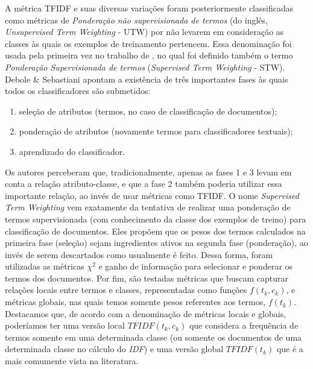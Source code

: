A métrica \textsc{TFIDF} e suas diversas variações foram posteriormente classificadas como métricas de \textit{Ponderação não supervisionada de termos} (do inglês, \textit{Unsupervised Term Weighting} - \textsc{UTW}) por não levarem em consideração as classes às quais os exemplos de treinamento pertencem. Essa denominação foi usada pela primeira vez no trabalho de \cite{Debole03}, no qual foi definido também o termo \textit{Ponderação Supervisionada de termos} (\textit{Supervised Term Weighting} - \textsc{STW}). 
Debole \& Sebastiani apontam a existência de três importantes fases às quais todos os classificadores são submetidos: 
\begin{enumerate}
\item seleção de atributos (termos, no caso de classificação de documentos);
\item ponderação de atributos (novamente termos para classificadores textuais);
\item aprendizado do classificador.
\end{enumerate}
Os autores perceberam que, tradicionalmente, apenas as fases 1 e 3 levam em conta a relação atributo-classe, e que a fase 2 também poderia utilizar essa importante relação, ao invés de usar métricas como \textsc{TFIDF}.
O nome \textit{Supervised Term Weighting} vem exatamente da tentativa de realizar uma ponderação de termos supervisionada (com conhecimento da classe dos exemplos de treino) para classificação de documentos. Eles propõem que os pesos dos termos calculados na primeira fase (seleção) sejam ingredientes ativos na segunda fase (ponderação), ao invés de serem descartados como usualmente é feito. 
Dessa forma, foram utilizadas as métricas $\chi^2$ e ganho de informação para selecionar e ponderar os termos dos documentos.
Por fim, são testadas métricas que buscam capturar relações locais entre termos e classes, representadas como funções $f(t_k, c_k)$, e métricas globais, nas quais temos somente pesos referentes aos termos, $f(t_k)$. 
Destacamos que, de acordo com a denominação de métricas locais e globais, poderíamos ter uma versão local \textit{$TFIDF(t_k, c_k)$} que considera a frequência de termos somente em uma determinada classe (ou somente os documentos de uma determinada classe no cálculo do \textit{IDF}) e uma versão global \textit{$TFIDF(t_k)$} que é a mais comumente vista na literatura.


